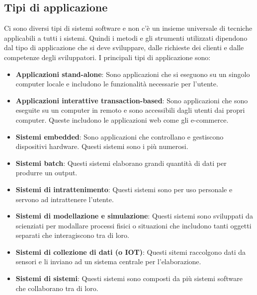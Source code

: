 \documentclass[a4paper]{article}
\begin{document}
\subsection{Tipi di applicazione}
Ci sono diversi tipi di sistemi software e non c'è un insieme universale di tecniche
applicabili a tutti i sistemi. Quindi i metodi e gli strumenti utilizzati dipendono
dal tipo di applicazione che si deve sviluppare, dalle richieste dei clienti
e dalle competenze degli sviluppatori. I principali tipi di applicazione sono:
\begin{itemize}
  \item 
    \textbf{Applicazioni stand-alone}:
    Sono applicazioni che si eseguono su un singolo computer locale e includono le
    funzionalità necessarie per l'utente.

  \item 
    \textbf{Applicazioni interattive transaction-based}:
    Sono applicazioni che sono eseguite su un computer in remoto e sono accessibili
    dagli utenti dai propri computer. Queste includono le applicazioni web come
    gli e-commerce.

  \item 
    \textbf{Sistemi embedded}:
    Sono applicazioni che controllano e gestiscono dispositivi hardware. Questi sistemi
    sono i più numerosi.

  \item 
    \textbf{Sistemi batch}:
    Questi sistemi elaborano grandi quantità di dati per produrre un output.

  \item 
    \textbf{Sistemi di intrattenimento}:
    Questi sistemi sono per uso personale e servono ad intrattenere l'utente.

  \item 
    \textbf{Sistemi di modellazione e simulazione}:
    Questi sistemi sono sviluppati da scienziati per modallare processi fisici o situazioni
    che includono tanti oggetti separati che interagiscono tra di loro.

  \item 
    \textbf{Sistemi di collezione di dati (o IOT)}:
    Questi sitemi raccolgono dati da sensori e li inviano ad un sistema centrale per
    l'elaborazione.

  \item 
    \textbf{Sistemi di sistemi}:
    Questi sistemi sono composti da più sistemi software che collaborano tra di loro.
\end{itemize}
\end{document}
